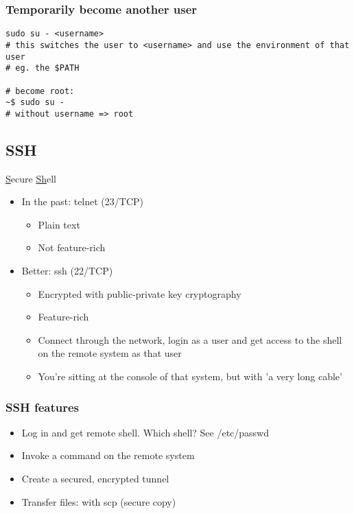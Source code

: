\documentclass{article}
\begin{document}
\subsubsection{Temporarily become another user}

\begin{verbatim}
sudo su - <username>
# this switches the user to <username> and use the environment of that user
# eg. the $PATH

# become root:
~$ sudo su -
# without username => root
\end{verbatim}


\subsection{SSH}

\underline{S}ecure \underline{Sh}ell

\begin{itemize}
    \item In the past: telnet (23/TCP)
    \begin{itemize}
        \item Plain text
        \item Not feature-rich
    \end{itemize}
    \item Better: ssh (22/TCP)
    \begin{itemize}
        \item Encrypted with public-private key cryptography
        \item Feature-rich
        \item Connect through the network, login as a user and get access to the shell on the remote system as that user
        \item You're sitting at the console of that system, but with 'a very long cable'
    \end{itemize}
\end{itemize}

\subsubsection{SSH features}

\begin{itemize}
    \item Log in and get remote shell. Which shell? See /etc/passwd
    \item Invoke a command on the remote system
    \item Create a secured, encrypted tunnel
    \item Transfer files: with scp (secure copy)
\end{itemize}
\end{document}

